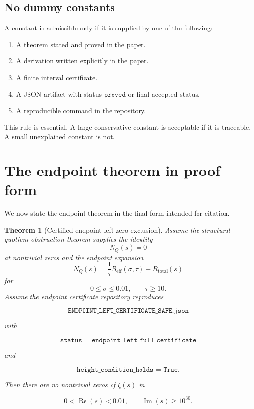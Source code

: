 \documentclass[11pt]{article}
\newtheorem{theorem}{Theorem}[section]
\DeclareMathOperator{\Rea}{Re}
\DeclareMathOperator{\Ima}{Im}
\newcommand{\NQ}{N_Q}
\newcommand{\Beff}{B_{\mathrm{eff}}}
\newcommand{\Rtot}{R_{\mathrm{total}}}
\newcommand{\ii}{\mathrm{i}}
\begin{document}
\subsection{No dummy constants}

A constant is admissible only if it is supplied by one of the following:

\begin{enumerate}[label=\arabic*.]
\item A theorem stated and proved in the paper.
\item A derivation written explicitly in the paper.
\item A finite interval certificate.
\item A JSON artifact with status \(\texttt{proved}\) or final accepted status.
\item A reproducible command in the repository.
\end{enumerate}

This rule is essential.  A large conservative constant is acceptable if it is traceable.  A small unexplained constant is not.

\section{The endpoint theorem in proof form}

We now state the endpoint theorem in the final form intended for citation.

\begin{theorem}[Certified endpoint-left zero exclusion]
Assume the structural quotient obstruction theorem supplies the identity
\[
\NQ(s)=0
\]
at nontrivial zeros and the endpoint expansion
\[
\NQ(s)=\frac{\ii}{\tau}\Beff(\sigma,\tau)+\Rtot(s)
\]
for
\[
0\leq\sigma\leq0.01,
\qquad
\tau\geq10.
\]
Assume the endpoint certificate repository reproduces

\[
\texttt{ENDPOINT\_LEFT\_CERTIFICATE\_SAFE.json}
\]

with

\[
\texttt{status = endpoint\_left\_full\_certificate}
\]

and

\[
\texttt{height\_condition\_holds = True}.
\]

Then there are no nontrivial zeros of \(\zeta(s)\) in

\[
0<\Rea(s)<0.01,
\qquad
\Ima(s)\geq10^{30}.
\]
\end{theorem}
\end{document}
